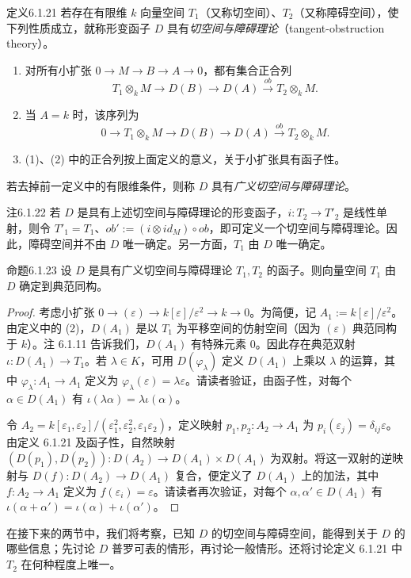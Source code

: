 \begin{origstatement}{定义}{6.1.21}\label{ch06:6.1.21}
若存在有限维 $k$ 向量空间 $T_1$（又称切空间）、$T_2$（又称障碍空间），使下列性质成立，就称形变函子 $D$ 具有\emph{切空间与障碍理论}（tangent-obstruction theory）。
\begin{enumerate}[label=(\arabic*)]
\item 对所有小扩张 $0\to M\to B\to A\to0$，都有集合正合列
\[
T_1\otimes_k M\longrightarrow D(B)\longrightarrow D(A)
\xrightarrow{ob}T_2\otimes_k M.
\]
\item 当 $A=k$ 时，该序列为
\[
0\longrightarrow T_1\otimes_k M\longrightarrow D(B)\longrightarrow D(A)
\xrightarrow{ob}T_2\otimes_k M.
\]
\item (1)、(2) 中的正合列按上面定义的意义，关于小扩张具有函子性。
\end{enumerate}
若去掉前一定义中的有限维条件，则称 $D$ 具有\emph{广义切空间与障碍理论}。
\end{origstatement}
\begin{origstatement}{注}{6.1.22}\label{ch06:6.1.22}
若 $D$ 是具有上述切空间与障碍理论的形变函子，$i:T_2\to T'_2$ 是线性单射，则令 $T'_1=T_1$、$ob':=(i\otimes id_M)\circ ob$，即可定义一个切空间与障碍理论。因此，障碍空间并不由 $D$ 唯一确定。另一方面，$T_1$ 由 $D$ 唯一确定。
\end{origstatement}
\begin{origstatement}{命题}{6.1.23}\label{ch06:6.1.23}
设 $D$ 是具有广义切空间与障碍理论 $T_1,T_2$ 的函子。则向量空间 $T_1$ 由 $D$ 确定到典范同构。
\end{origstatement}
\begin{proof}
考虑小扩张 $0\to(\varepsilon)\to k[\varepsilon]/\varepsilon^2\to k\to0$。为简便，记 $A_1:=k[\varepsilon]/\varepsilon^2$。由定义中的 (2)，$D(A_1)$ 是以 $T_1$ 为平移空间的仿射空间（因为 $(\varepsilon)$ 典范同构于 $k$）。注 6.1.11 告诉我们，$D(A_1)$ 有特殊元素 $0$。因此存在典范双射 $\iota:D(A_1)\to T_1$。若 $\lambda\in K$，可用 $D(\varphi_\lambda)$ 定义 $D(A_1)$ 上乘以 $\lambda$ 的运算，其中 $\varphi_\lambda:A_1\to A_1$ 定义为 $\varphi_\lambda(\varepsilon)=\lambda\varepsilon$。请读者验证，由函子性，对每个 $\alpha\in D(A_1)$ 有 $\iota(\lambda\alpha)=\lambda\iota(\alpha)$。

令 $A_2=k[\varepsilon_1,\varepsilon_2]/(\varepsilon_1^2,\varepsilon_2^2,\varepsilon_1\varepsilon_2)$，定义映射 $p_1,p_2:A_2\to A_1$ 为 $p_i(\varepsilon_j)=\delta_{ij}\varepsilon$。由定义 6.1.21 及函子性，自然映射 $(D(p_1),D(p_2)):D(A_2)\to D(A_1)\times D(A_1)$ 为双射。将这一双射的逆映射与 $D(f):D(A_2)\to D(A_1)$ 复合，便定义了 $D(A_1)$ 上的加法，其中 $f:A_2\to A_1$ 定义为 $f(\varepsilon_i)=\varepsilon$。请读者再次验证，对每个 $\alpha,\alpha'\in D(A_1)$ 有 $\iota(\alpha+\alpha')=\iota(\alpha)+\iota(\alpha')$。
\end{proof}
在接下来的两节中，我们将考察，已知 $D$ 的切空间与障碍空间，能得到关于 $D$ 的哪些信息；先讨论 $D$ 普罗可表的情形，再讨论一般情形。还将讨论定义 6.1.21 中 $T_2$ 在何种程度上唯一。

